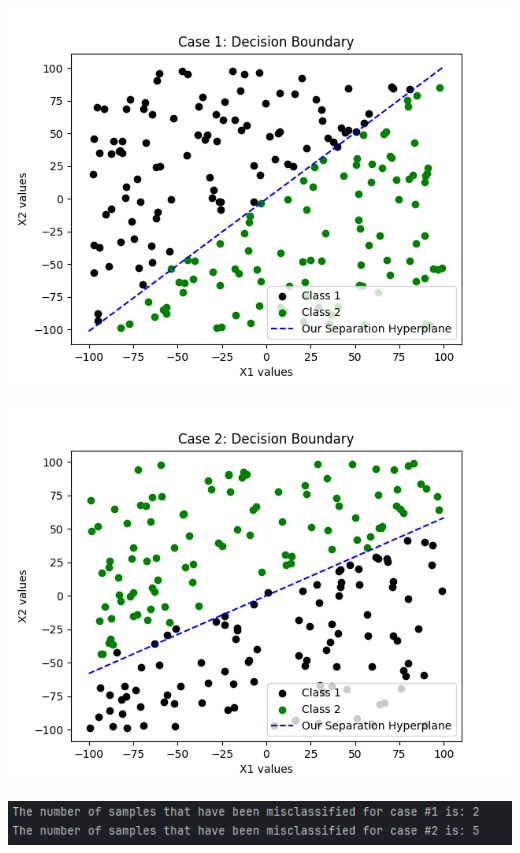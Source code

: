 \documentclass{article}
\begin{document}
\begin{center}
\includegraphics[scale=0.75]{../figs/T2.2.png} \\
\end{center}

\begin{center}
\includegraphics[scale=0.75]{../figs/T2.3.png} \\
\end{center}

\begin{center}
\includegraphics[scale=0.75]{../figs/T2.4.png} \\
\end{center}
\end{document}
